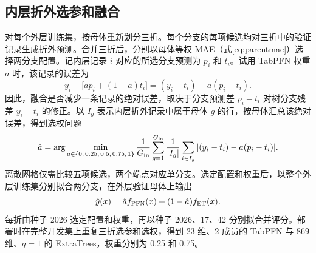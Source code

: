 \subsection{内层折外选参和融合}
对每个外层训练集，按母体重新划分三折。每个分支的每项候选均对三折中的验证记录生成折外预测。合并三折后，分别以母体等权 MAE（式\ref{eq:parentmae}）选择两分支配置。记内层记录 $i$ 对应的所选分支预测为 $p_i$ 和 $t_i$。试用 TabPFN 权重 $a$ 时，该记录的误差为
\begin{equation}
y_i-\big[a p_i+(1-a)t_i\big]=(y_i-t_i)-a(p_i-t_i).
\end{equation}
因此，融合是否减少一条记录的绝对误差，取决于分支预测差 $p_i-t_i$ 对树分支残差 $y_i-t_i$ 的修正。以 $I_g$ 表示内层折外记录中属于母体 $g$ 的行，按母体汇总该绝对误差，得到选权问题
\begin{equation}\label{eq:selectblend}
\hat a=\arg\min_{a\in\{0,\,0.25,\,0.5,\,0.75,\,1\}}
\frac{1}{G_{\rm in}}\sum_{g=1}^{G_{\rm in}}
\frac{1}{|I_g|}\sum_{i\in I_g}|(y_i-t_i)-a(p_i-t_i)|.
\end{equation}
离散网格仅需比较五项候选，两个端点对应单分支。选定配置和权重后，以整个外层训练集分别拟合两分支，在外层验证母体上输出
\begin{equation}\label{eq:newblend}
\hat y(x)=\hat a f_{\rm PFN}(x)+(1-\hat a)f_{\rm ET}(x).
\end{equation}
每折由种子 2026 选定配置和权重，再以种子 2026、17、42 分别拟合并评分。部署时在完整开发集上重复三折选参和选权，得到 23 维、2 成员的 TabPFN 与 869 维、$q=1$ 的 ExtraTrees，权重分别为 0.25 和 0.75。
